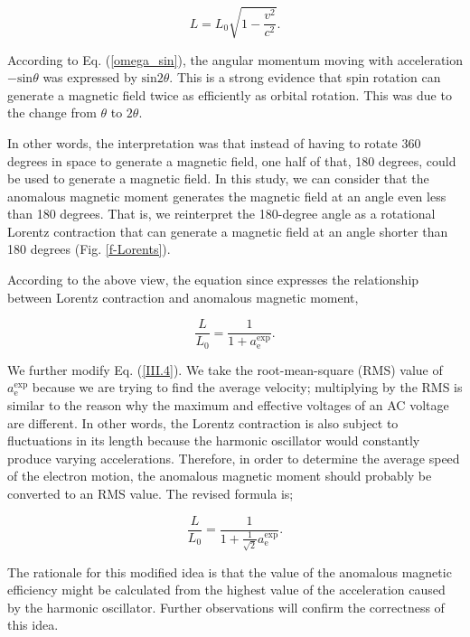 \documentclass[%
 reprint,
 amsmath,amssymb,
 aps,
]{revtex4-1}
\numberwithin{equation}{section}%
\begin{document}
    \begin{equation}
        L = L_0 \sqrt{1 - \frac{v^2}{c^2}} .
    \end{equation}

According to Eq. (\ref{omega_sin}), the angular momentum moving with acceleration $\mathrm{-sin}\theta$ was expressed by $\mathrm{sin}2\theta$. This is a strong evidence that spin rotation can generate a magnetic field twice as efficiently as orbital rotation. This was due to the change from $\theta$ to $2\theta$.

In other words, the interpretation was that instead of having to rotate 360 degrees in space to generate a magnetic field, one half of that, 180 degrees, could be used to generate a magnetic field. In this study, we can consider that the anomalous magnetic moment generates the magnetic field at an angle even less than 180 degrees. That is, we reinterpret the 180-degree angle as a rotational Lorentz contraction that can generate a magnetic field at an angle shorter than 180 degrees (Fig. \ref{f-Lorents}).

According to the above view, the equation since expresses the relationship between Lorentz contraction and anomalous magnetic moment,

    \begin{equation}
        \frac{L}{L_0} = \frac{1}{1 + a^{\text{exp}}_{\text{e}}} .
        \label{III.4}
    \end{equation}

We further modify Eq. (\ref{III.4}). We take the root-mean-square (RMS) value of $a^{\text{exp}}_{\text{e}}$ because we are trying to find the average velocity; multiplying by the RMS is similar to the reason why the maximum and effective voltages of an AC voltage are different. In other words, the Lorentz contraction is also subject to fluctuations in its length because the harmonic oscillator would constantly produce varying accelerations. Therefore, in order to determine the average speed of the electron motion, the anomalous magnetic moment should probably be converted to an RMS value. The revised formula is;

    \begin{equation}
        \frac{L}{L_0} = \frac{1}{1 + \frac{1}{\sqrt{2}}a^{\text{exp}}_{\text{e}}} .
        \label{III.5}
    \end{equation}

The rationale for this modified idea is that the value of the anomalous magnetic efficiency might be calculated from the highest value of the acceleration caused by the harmonic oscillator. Further observations will confirm the correctness of this idea.
\end{document}
